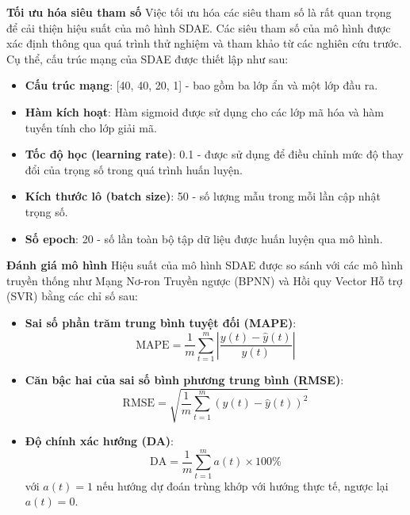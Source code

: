 \textbf{Tối ưu hóa siêu tham số}
Việc tối ưu hóa các siêu tham số là rất quan trọng để cải thiện hiệu suất của mô hình SDAE. Các siêu tham số của mô hình được xác định thông qua quá trình thử nghiệm và tham khảo từ các nghiên cứu trước. Cụ thể, cấu trúc mạng của SDAE được thiết lập như sau:

\begin{itemize}
    \item \textbf{Cấu trúc mạng}: [40, 40, 20, 1] - bao gồm ba lớp ẩn và một lớp đầu ra.
    \item \textbf{Hàm kích hoạt}: Hàm sigmoid được sử dụng cho các lớp mã hóa và hàm tuyến tính cho lớp giải mã.
    \item \textbf{Tốc độ học (learning rate)}: 0.1 - được sử dụng để điều chỉnh mức độ thay đổi của trọng số trong quá trình huấn luyện.
    \item \textbf{Kích thước lô (batch size)}: 50 - số lượng mẫu trong mỗi lần cập nhật trọng số.
    \item \textbf{Số epoch}: 20 - số lần toàn bộ tập dữ liệu được huấn luyện qua mô hình.
\end{itemize}

\textbf{Đánh giá mô hình}
Hiệu suất của mô hình SDAE được so sánh với các mô hình truyền thống như Mạng Nơ-ron Truyền ngược (BPNN) và Hồi quy Vector Hỗ trợ (SVR) bằng các chỉ số sau:

\begin{itemize}
    \item \textbf{Sai số phần trăm trung bình tuyệt đối (MAPE)}:
    \begin{equation}
        \text{MAPE} = \frac{1}{m} \sum_{t=1}^m \left| \frac{y(t) - \hat{y}(t)}{y(t)} \right|
    \end{equation}
    
    \item \textbf{Căn bậc hai của sai số bình phương trung bình (RMSE)}:
    \begin{equation}
        \text{RMSE} = \sqrt{\frac{1}{m} \sum_{t=1}^m \left( y(t) - \hat{y}(t) \right)^2}
    \end{equation}
    
    \item \textbf{Độ chính xác hướng (DA)}:
    \begin{equation}
        \text{DA} = \frac{1}{m} \sum_{t=1}^m a(t) \times 100\%
    \end{equation}
    với $a(t) = 1$ nếu hướng dự đoán trùng khớp với hướng thực tế, ngược lại $a(t) = 0$.
\end{itemize}
